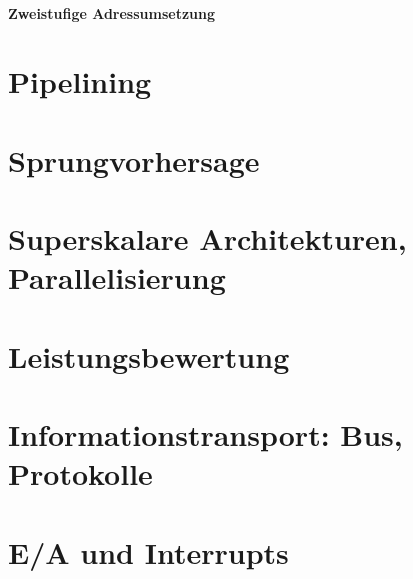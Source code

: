 \subsubsection{Zweistufige Adressumsetzung}

\chapter{Pipelining}

\chapter{Sprungvorhersage}

\chapter{Superskalare Architekturen, Parallelisierung}

\chapter{Leistungsbewertung}

\chapter{Informationstransport: Bus, Protokolle}

\chapter{E/A und Interrupts}

%



